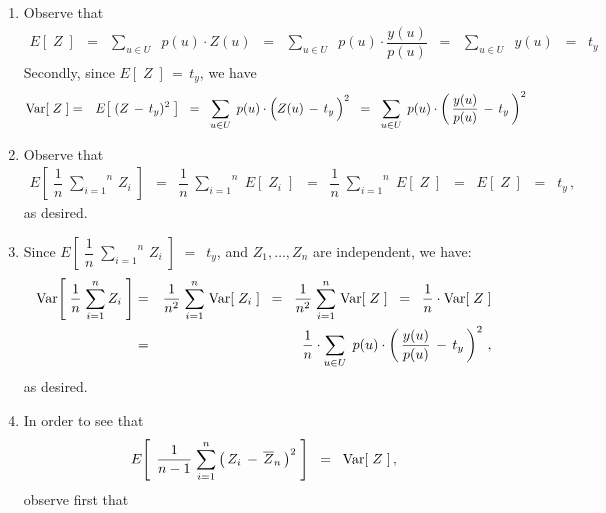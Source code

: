 \begin{enumerate}
\item
	Observe that
	\begin{eqnarray*}
	E\!\left[\;Z\;\right]
	&=&
		\underset{u \in U}{\sum}\;\; p(u) \cdot Z(u)
	\;\; = \;\;
		\underset{u \in U}{\sum}\;\; p(u) \cdot \dfrac{y(u)}{p(u)}
	\;\; = \;\;
		\underset{u \in U}{\sum}\;\; y(u)
	\;\; = \;\;
		t_{y}
	\end{eqnarray*}
	Secondly, since \;$E\!\left[\;Z\;\right] \,=\, t_{y}$,\; we have
	\begin{eqnarray*}
	\Var\!\left[\;Z\;\right]
	&=&
		E\!\left[\;(Z\,-\,t_{y})^{2}\;\right]	
	\;\; = \;\;
		\underset{u \in U}{\sum}\;\, p(u)\cdot\left(\overset{{\color{white}.}}{Z}(u)\,-\,t_{y}\,\right)^{2}
	\;\; = \;\;
		\underset{u \in U}{\sum}\;\, p(u)\cdot\left(\,\dfrac{y(u)}{p(u)}\,-\,t_{y}\,\right)^{2}
	\end{eqnarray*}
\item
	Observe that
	\begin{eqnarray*}
	E\!\left[\;\dfrac{1}{n}\;\overset{n}{\underset{i=1}{\sum}}\,Z_{i}\;\right]
	&=&
		\dfrac{1}{n}\;\overset{n}{\underset{i=1}{\sum}}\;E\!\left[\;Z_{i}\;\right]
	\;\; = \;\;
		\dfrac{1}{n}\;\overset{n}{\underset{i=1}{\sum}}\;E\!\left[\;Z\;\right]
	\;\; = \;\;
		E\!\left[\;Z\;\right]
	\;\; = \;\;
		t_{y}\,,
	\end{eqnarray*}
	as desired.
\item
	Since \;$E\!\left[\;\dfrac{1}{n}\;\overset{n}{\underset{i=1}{\sum}}\,Z_{i}\;\right]$ $=$\, $t_{y}$,\;
	and \;$Z_{1}, \ldots, Z_{n}$\; are independent, we have:
	\begin{eqnarray*}
	\textnormal{Var}\!\left[\;\dfrac{1}{n}\;\overset{n}{\underset{i=1}{\sum}}\,Z_{i}\;\right]
	&=&
		\dfrac{1}{n^{2}}\;\overset{n}{\underset{i=1}{\sum}}\;\textnormal{Var}\!\left[\;Z_{i}\;\right]
	\;\; = \;\;
		\dfrac{1}{n^{2}}\;\overset{n}{\underset{i=1}{\sum}}\;\textnormal{Var}\!\left[\;Z\;\right]
	\;\; = \;\;
		\dfrac{1}{n}\cdot\textnormal{Var}\!\left[\;Z\;\right]
	\\
	&=&
		\dfrac{1}{n}\cdot
		\underset{u \in U}{\sum}\;\, p(u)\cdot\left(\,\dfrac{y(u)}{p(u)}\,-\,t_{y}\,\right)^{2}\,,
	\end{eqnarray*}
	as desired.
\item
	In order to see that
	\begin{eqnarray*}
	E\!\left[\;\,\dfrac{1}{n-1}\;\overset{n}{\underset{i=1}{\sum}}\left(\,Z_{i} \,-\, \overline{Z}_{n}\,\right)^{2}\;\right]
	\;\; = \;\;
		\textnormal{Var}\!\left[\;Z\;\right],
	\end{eqnarray*}
	observe first that

\end{enumerate}
